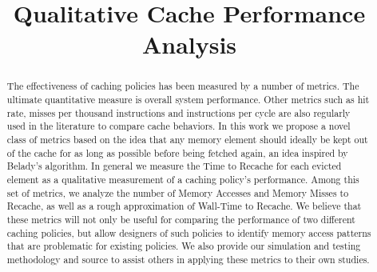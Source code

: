 \documentclass[conference]{IEEEtran}
\begin{document}
\title{Qualitative Cache Performance Analysis}

\author{}

\maketitle

\begin{abstract}
The effectiveness of caching policies has been measured by a number of metrics. 
The ultimate quantitative measure is overall system performance.
Other metrics such as hit rate, misses per thousand instructions and
instructions per cycle are also regularly used in the literature to
compare cache behaviors.
In this work we propose a novel class of metrics based on the idea
that any memory element should ideally be kept out of the cache
for as long as possible before being fetched again, an idea inspired
by Belady's algorithm.
In general we measure the Time to Recache for each evicted element as a qualitative measurement of a caching policy's performance.
Among this set of metrics, we analyze the number of Memory Accesses and Memory Misses to Recache, as well as a rough approximation
of Wall-Time to Recache.
We believe that these metrics will not only be useful for comparing the performance of two different caching policies,
  but allow designers of such policies to identify memory access
  patterns that are problematic for existing policies.
We also provide our simulation and testing methodology and source to
assist others in applying these metrics to their own
studies.
\end{abstract}











\end{document}
